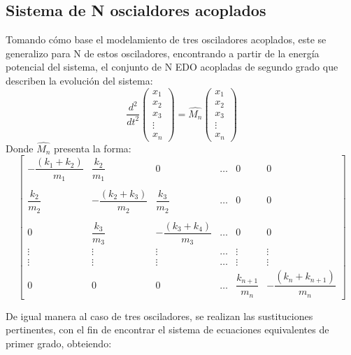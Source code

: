 \documentclass[11pt,letterpaper,twocolumn]{article}
\begin{document}
\subsection*{Sistema de N oscialdores acoplados}
Tomando cómo base el modelamiento de tres osciladores acoplados, este se generalizo para N de estos osciladores, encontrando a partir de la energía potencial del sistema, el conjunto de N EDO acopladas de segundo grado que describen la evolución del sistema: 
\[
\dfrac{d^{2}}{dt^{2}} \left(
\begin{matrix}
x_{1}\\
x_{2}\\
x_{3}\\
\vdots\\
x_{n}
\end{matrix} \right) = \hat{M_{n}}  \left(
\begin{matrix}
x_{1}\\
x_{2}\\
x_{3}\\
\vdots\\
x_{n}
\end{matrix} \right)
\] 
Donde $\hat{M_{n}}$ presenta la forma: 
{\fontsize{5.5}{15}\selectfont
\[\left[
\begin{matrix}
-\dfrac{(k_{1}+k_{2})}{m_{1}}&\dfrac{k_{2}}{m_{1}}&0&\dots&0 & 0 \\
\\
\dfrac{k_{2}}{m_{2}}&-\dfrac{(k_{2}+k_{3})}{m_{2}}&\dfrac{k_{3}}{m_{2}}&\dots&0&0\\
\\
0 &\dfrac{k_{3}}{m_{3}}&-\dfrac{(k_{3}+k_{4})}{m_{3}}&\dots&0&0\\
\vdots&\vdots&\vdots&\dots&\vdots&\vdots\\
\vdots&\vdots&\vdots&\dots&\vdots&\vdots\\
 0 & 0 & 0 & \dots & \dfrac{k_{n+1}}{m_{n}} &-\dfrac{(k_{n}+k_{n+1})}{m_{n}}
\end{matrix} \right]
\]}
\par 
De igual manera al caso de tres osciladores, se realizan las sustituciones pertinentes, con el fin de encontrar el sistema de ecuaciones equivalentes de primer grado, obteiendo: 
\end{document}
